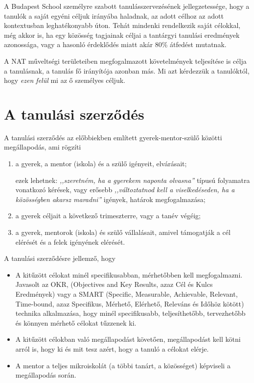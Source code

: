 A Budapest School személyre szabott tanulásszervezésének jellegzetessége, hogy
a tanulók a saját egyéni céljuk irányába haladnak, az adott célhoz az adott
kontextusban leghatékonyabb úton. Tehát mindenki rendelkezik saját célokkal,
még akkor is, ha egy közösség tagjainak céljai a tantárgyi tanulási eredmények
azonossága, vagy a hasonló érdeklődés miatt akár  80\% átfedést mutatnak.

A NAT műveltségi területeiben megfogalmazott követelmények teljesítése is célja
a tanulásnak, a tanulás fő irányítója azonban más. Mi azt kérdezzük a
tanulóktól, hogy \emph{ezen felül} mi az ő személyes céljuk.

\section{A tanulási szerződés}

A tanulási szerződés az előbbiekben említett gyerek-mentor-szülő közötti
megállapodás, ami rögzíti
\begin{enumerate}
      \item a gyerek, a mentor (iskola) és a szülő igényeit, elvárásait;

            ezek lehetnek: \emph{,,szeretném, ha a gyerekem naponta olvasna''}
            típusú
            folyamatra vonatkozó kérések, vagy erősebb \emph{,,változtatnod
                  kell a
                  viselkedéseden, ha a közösségben akarsz maradni''} igények,
            határok
            megfogalmazása;

      \item a gyerek céljait a következő trimeszterre, vagy a tanév végéig;

      \item a gyerek, mentorok (iskola) és szülő vállalásait, amivel támogatják
            a
            cél
            elérését és a felek igényének elérését.

\end{enumerate}

A tanulási szerződésre jellemző, hogy
\begin{itemize}
      \item A kitűzött célokat minél specifikusabban, mérhetőbben kell
            megfogalmazni.
            Javasolt az OKR,  (Objectives and Key Results, azaz  Cél és Kulcs
            Eredmények)
            \citep{okr} vagy a SMART (Specific, Measurable, Achievable,
            Relevant,
            Time-bound, azaz Specifikus,  Mérhető, Elérhető, Releváns és Időhöz
            kötött)
            \citep{wiki:smart} technika alkalmazása, hogy minél specifikusabb,
            teljesíthetőbb, tervezhetőbb és könnyen mérhető célokat tűzzenek
            ki.

      \item A kitűzött célokban való megállapodást követően, megállapodást
            kell
            kötni arról is, hogy ki és mit tesz azért, hogy a tanuló a célokat
            elérje.

      \item A mentor a teljes mikroiskolát (a többi tanárt, a közösséget)
            képviseli
            a
            megállapodás során.
\end{itemize}

